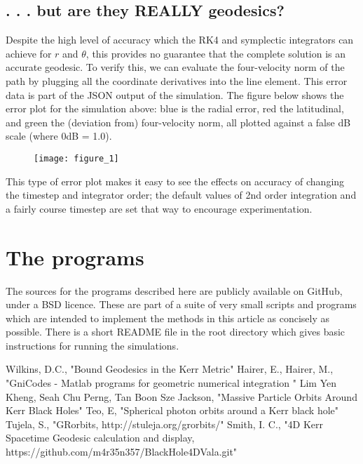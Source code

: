 \documentclass[11pt]{article}
\begin{document}
\subsection{. . . but are they REALLY geodesics?}

Despite the high level of accuracy which the RK4 and symplectic integrators can achieve for $r$ and $\theta$, this provides no guarantee that the complete solution is an accurate geodesic.  To verify this, we can evaluate the four-velocity norm of the path by plugging all the coordinate derivatives into the line element.  This error data is part of the JSON output of the simulation.  The figure below shows the error plot for the simulation above: blue is the radial error, red the latitudinal, and green the (deviation from) four-velocity norm, all plotted against a false dB scale (where 0dB = 1.0).
\begin{figure}[h]
\texttt{[image: figure\_1]}
\end{figure}
This type of error plot makes it easy to see the effects on accuracy of changing the timestep and integrator order; the default values of 2nd order integration and a fairly course timestep are set that way to encourage experimentation.

\section{The programs}

The sources for the programs \cite{m4r35n357} described here are publicly available on GitHub, under a BSD licence.  These are part of a suite of very small scripts and programs which are intended to implement the methods in this article as concisely as possible.  There is a short README file in the root directory which gives basic instructions for running the simulations.

\begin{thebibliography}{1}
 Wilkins, D.C., "Bound Geodesics in the Kerr Metric"
  Hairer, E., Hairer, M., "GniCodes - Matlab programs for geometric numerical integration "
 Lim Yen Kheng, Seah Chu Perng, Tan Boon Sze Jackson, "Massive Particle Orbits Around Kerr Black Holes"
 Teo, E, "Spherical photon orbits around a Kerr black hole"
 Tujela, S., "GRorbits, http://stuleja.org/grorbits/"
 Smith, I. C., "4D Kerr Spacetime Geodesic calculation and display, https://github.com/m4r35n357/BlackHole4DVala.git"
\end{thebibliography}
\end{document}

